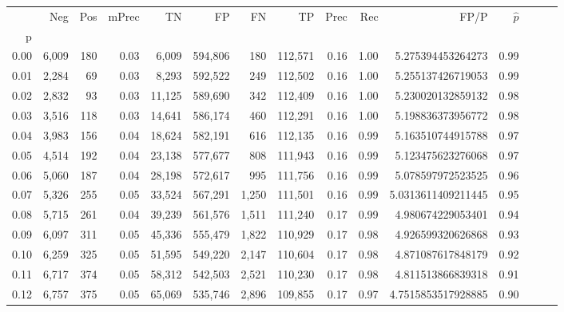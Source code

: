 \begin{tabular}{rrrrrrrrrrrrrrr}
\toprule
{} &     Neg &    Pos & mPrec &       TN &       FP &       FN &       TP &  Prec &   Rec &                  FP/P & $\hat{p}$ \\
p    &         &        &       &          &          &          &          &       &       &                       &           \\
\midrule
0.00 &   6,009 &    180 &  0.03 &    6,009 &  594,806 &      180 &  112,571 &  0.16 &  1.00 &     5.275394453264273 &      0.99 \\
0.01 &   2,284 &     69 &  0.03 &    8,293 &  592,522 &      249 &  112,502 &  0.16 &  1.00 &     5.255137426719053 &      0.99 \\
0.02 &   2,832 &     93 &  0.03 &   11,125 &  589,690 &      342 &  112,409 &  0.16 &  1.00 &     5.230020132859132 &      0.98 \\
0.03 &   3,516 &    118 &  0.03 &   14,641 &  586,174 &      460 &  112,291 &  0.16 &  1.00 &     5.198836373956772 &      0.98 \\
0.04 &   3,983 &    156 &  0.04 &   18,624 &  582,191 &      616 &  112,135 &  0.16 &  0.99 &     5.163510744915788 &      0.97 \\
0.05 &   4,514 &    192 &  0.04 &   23,138 &  577,677 &      808 &  111,943 &  0.16 &  0.99 &     5.123475623276068 &      0.97 \\
0.06 &   5,060 &    187 &  0.04 &   28,198 &  572,617 &      995 &  111,756 &  0.16 &  0.99 &     5.078597972523525 &      0.96 \\
0.07 &   5,326 &    255 &  0.05 &   33,524 &  567,291 &    1,250 &  111,501 &  0.16 &  0.99 &    5.0313611409211445 &      0.95 \\
0.08 &   5,715 &    261 &  0.04 &   39,239 &  561,576 &    1,511 &  111,240 &  0.17 &  0.99 &     4.980674229053401 &      0.94 \\
0.09 &   6,097 &    311 &  0.05 &   45,336 &  555,479 &    1,822 &  110,929 &  0.17 &  0.98 &     4.926599320626868 &      0.93 \\
0.10 &   6,259 &    325 &  0.05 &   51,595 &  549,220 &    2,147 &  110,604 &  0.17 &  0.98 &     4.871087617848179 &      0.92 \\
0.11 &   6,717 &    374 &  0.05 &   58,312 &  542,503 &    2,521 &  110,230 &  0.17 &  0.98 &     4.811513866839318 &      0.91 \\
0.12 &   6,757 &    375 &  0.05 &   65,069 &  535,746 &    2,896 &  109,855 &  0.17 &  0.97 &    4.7515853517928885 &      0.90 \\

\end{tabular}
